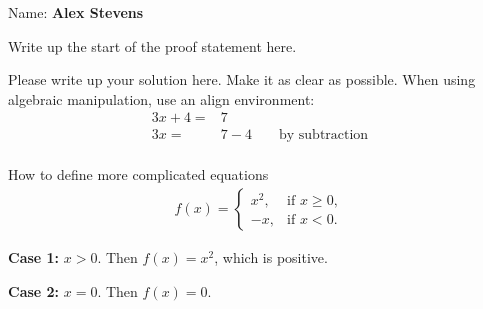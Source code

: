 \documentclass[solutions,answers]{exam}
\begin{document}
\vspace*{1em}
\noindent Name: \textbf{Alex Stevens}

\setlength\answerclearance{0.7ex}

\begin{questions}
\begin{question}

Write up the start of the proof statement here.

\begin{solution}
Please write up your solution here. Make it as clear as possible.
When using algebraic manipulation, use an align environment:
\begin{align}
3x+4=&7&& \\
3x=&7-4 && \text{ by subtraction}\\
\end{align}

How to define more complicated equations
\begin{align}
f(x) =
\begin{cases}
x^2, & \text{if } x \ge 0,\\
-x,  & \text{if } x < 0.
\end{cases}
\end{align}

\textbf{Case 1:} $x > 0$.  
Then $f(x) = x^2$, which is positive.

\medskip
\textbf{Case 2:} $x = 0$.  
Then $f(x) = 0$.

\end{solution}
\end{question}
\end{questions}
\end{document}
